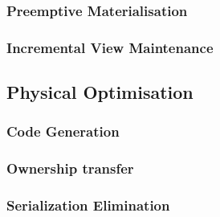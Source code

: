 \subsubsection{Preemptive Materialisation}

\subsubsection{Incremental View Maintenance}


\subsection{Physical Optimisation}

\subsubsection{Code Generation}


\subsubsection{Ownership transfer}

\subsubsection{Serialization Elimination}
